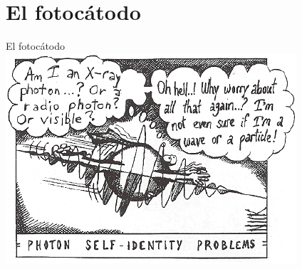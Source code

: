 \documentclass[a4paper,10pt]{beamer}
\begin{document}
\section{El fotocátodo}

\begin{frame}
\begin{center}
 \Huge{\color{blue}El fotocátodo} \\
 \vspace{1cm}
 \includegraphics[scale=0.75]{fig4}
\end{center}
\end{frame}
\end{document}

